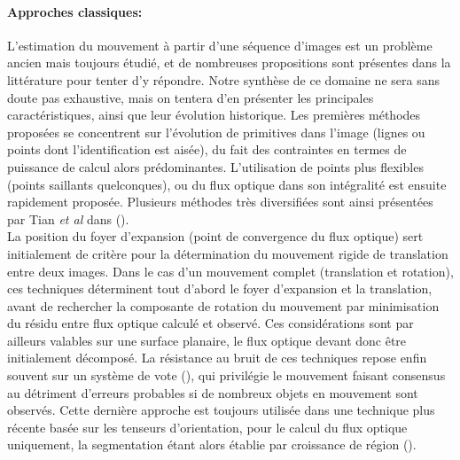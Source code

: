 \paragraph{Approches classiques:\\}
L'estimation du mouvement à partir d'une séquence d'images est un problème ancien mais toujours étudié, et de nombreuses propositions sont présentes dans la littérature pour tenter d'y répondre. Notre synthèse de ce domaine ne sera sans doute pas exhaustive, mais on tentera d'en présenter les principales caractéristiques, ainsi que leur évolution historique. Les premières méthodes proposées se concentrent sur l'évolution de primitives dans l'image (lignes ou points dont l'identification est aisée), du fait des contraintes en termes de puissance de calcul alors prédominantes. L'utilisation de points plus flexibles (points saillants quelconques), ou du flux optique dans son intégralité est ensuite rapidement proposée. Plusieurs méthodes très diversifiées sont ainsi présentées par Tian \textit{et al} dans (\cite{Tian1996}).\\

La position du foyer d'expansion (point de convergence du flux optique) sert initialement de critère pour la détermination du mouvement rigide de translation entre deux images. Dans le cas d'un mouvement complet (translation et rotation), ces techniques déterminent tout d'abord le foyer d'expansion et la translation, avant de rechercher la composante de rotation du mouvement par minimisation du résidu entre flux optique calculé et observé. Ces considérations sont par ailleurs valables sur une surface planaire, le flux optique devant donc être initialement décomposé. La résistance au bruit de ces techniques repose enfin souvent sur un système de vote (\cite{Adiv1985}), qui privilégie le mouvement faisant consensus au détriment d'erreurs probables si de nombreux objets en mouvement sont observés. Cette dernière approche est toujours utilisée dans une technique plus récente basée sur les tenseurs d'orientation, pour le calcul du flux optique uniquement, la segmentation étant alors établie par croissance de région (\cite{Farneback2000}).\\

